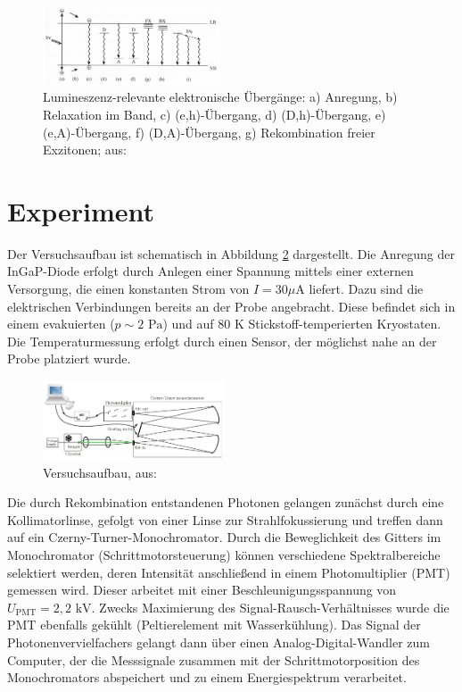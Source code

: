\documentclass[aps,twocolumn,secnumarabic,nobalancelastpage,amsmath,amssymb,
nofootinbib,superscriptaddress]{revtex4-1}
\begin{document}
\begin{figure}[h!]
  \centering
  \includegraphics[width=0.47\textwidth]{img/rekombinationswege.jpg}
  \caption{ Lumineszenz-relevante elektronische Übergänge: a) Anregung, b) Relaxation im Band,
  c) (e,h)-Übergang, d) (D,h)-Übergang, e) (e,A)-Übergang, f) (D,A)-Übergang, g) Rekombination freier Exzitonen; aus: \cite{saarland}}
  \label{fig:rekomb}
\end{figure}



\section{Experiment}

\noindent Der Versuchsaufbau ist schematisch in Abbildung \ref{fig:versuch} dargestellt. Die Anregung der InGaP-Diode erfolgt durch Anlegen einer
Spannung mittels einer externen Versorgung, die einen konstanten Strom von $I=30\text{$\mu$A}$ liefert. Dazu sind die elektrischen Verbindungen bereits an der Probe angebracht.
Diese befindet sich in einem evakuierten ($p\sim 2\text{ Pa}$) und auf $80\text{ K}$ Stickstoff-temperierten Kryostaten. Die Temperaturmessung
erfolgt durch einen Sensor, der möglichst nahe an der Probe platziert wurde.

\begin{figure}[h]
  \centering
  \includegraphics[width=0.48\textwidth]{img/versuchsanleitung.jpg}
  \caption{Versuchsaufbau, aus: \cite{anleitung}}
  \label{fig:versuch}
\end{figure}

\noindent Die durch Rekombination entstandenen Photonen gelangen zunächst durch eine Kollimatorlinse, gefolgt von einer Linse zur
Strahlfokussierung und treffen dann auf ein Czerny-Turner-Monochromator. Durch die Beweglichkeit des Gitters im
Monochromator (Schrittmotorsteuerung) können verschiedene Spektralbereiche selektiert werden, deren Intensität anschließend in einem Photomultiplier (PMT)
gemessen wird. Dieser arbeitet mit einer Beschleunigungsspannung von $U_\text{PMT}=2,2\text{ kV}$. Zwecks Maximierung des
Signal-Rausch-Verhältnisses wurde die PMT ebenfalls gekühlt (Peltierelement mit Wasserkühlung). Das Signal der Photonenvervielfachers
gelangt dann über einen Analog-Digital-Wandler zum Computer, der die Messsignale zusammen mit der Schrittmotorposition des Monochromators
abspeichert und zu einem Energiespektrum verarbeitet.\newpage
\end{document}
